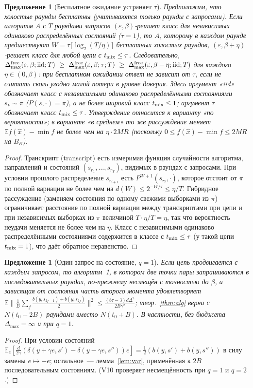 \documentclass[11pt,a4paper]{article}
\numberwithin{equation}{section}
\newtheorem{proposition}[theorem]{Предложение}
\theoremstyle{definition}
\theoremstyle{remark}
\newcommand{\E}{\mathbb E}\newcommand{\R}{\mathbb R}\newcommand{\N}{\mathbb N}\let\Prob\relax\newcommand{\Prob}{\mathbb P}
\newcommand{\norm}[1]{\lVert #1\rVert}\newcommand{\abs}[1]{\lvert #1\rvert}\newcommand{\ip}[2]{\langle #1,#2\rangle}
\newcommand{\Dmax}{\Delta_{\max}}\newcommand{\Dcp}{\Delta_{\rm cp}}
\begin{document}
\begin{proposition}[Бесплатное ожидание устраняет $\tau$]\label{prop:wait}
Предположим, что холостые раунды бесплатны (учитываются только раунды с запросами). Если алгоритм $A$ с $T$ раундами запросов $(\varepsilon,\beta)$-решает класс для независимых одинаково распределённых состояний ($\tau=1$), то $A$, которому в каждом раунде предшествуют $W=\tau\lceil\log_2(T/\eta)\rceil$ бесплатных холостых раундов, $(\varepsilon,\beta+\eta)$-решает класс для любой цепи с $t_{\rm mix}\le\tau$. Следовательно, $\Dmax^{\rm free}(\varepsilon,\beta;{\rm iid};T)\ \ge\ \Dmax^{\rm free}(\varepsilon,\beta;\tau;T)\ \ge\ \Dmax^{\rm free}(\varepsilon,\beta-\eta;{\rm iid};T)$ для каждого $\eta\in(0,\beta)$: при бесплатном ожидании ответ не зависит от $\tau$, если не считать сколь угодно малой потери в уровне доверия. Здесь аргумент «iid» обозначает класс с независимыми одинаково распределёнными состояниями $s_k\sim\pi$ ($P(s,\cdot)=\pi$), \emph{а не} более широкий класс $t_{\rm mix}\le1$; аргумент $\tau$ обозначает класс $t_{\rm mix}\le\tau$. Утверждение относится к варианту «по вероятности»; в варианте «в среднем» то же рассуждение меняет $\E f(\hat x)-\min f$ не более чем на $\eta\cdot2MR$ (поскольку $0\le f(\hat x)-\min f\le2MR$ на $B_R$).
\end{proposition}
\begin{proof}
Транскрипт (transcript) есть измеримая функция случайности алгоритма, направлений и состояний $(s_{r_1},\dots,s_{r_T})$, видимых в раундах с запросами. При условии прошлого распределение $s_{r_{i+1}}$ есть $P^{W+1}(s_{r_i},\cdot)$, которое отстоит от $\pi$ по полной вариации не более чем на $d(W)\le2^{-W/\tau}\le\eta/T$. Гибридное рассуждение (заменяем состояния по одному свежими выборками из $\pi$) ограничивает расстояние по полной вариации между транскриптами при цепи и при независимых выборках из $\pi$ величиной $T\cdot\eta/T=\eta$, так что вероятность неудачи меняется не более чем на $\eta$. Класс с независимыми одинаково распределёнными состояниями содержится в классе с $t_{\rm mix}\le\tau$ (у такой цепи $t_{\rm mix}=1$), что даёт обратное неравенство.
\end{proof}

\begin{proposition}[Один запрос на состояние, $q=1$]\label{prop:q1}
Если цепь продвигается с каждым запросом, то алгоритм~1, в котором две точки пары запрашиваются в последовательных раундах, по-прежнему несмещён с точностью до $\beta$, а зависящая от состояния часть второго момента удовлетворяет $\E\norm{\frac1B\sum_j\frac{b(y,s_{2j-1})+b(y,s_{2j})}2}^2\le\frac{(8\tau-3)d\Delta^2}{2B\gamma^2}$; теор.~\ref{thm:alg} верна с $N(t_0+2B)$ раундами вместо $N(t_0+B)$. В частности, без бюджета $\Dmax=\infty$ и при $q=1$.
\end{proposition}
\begin{proof}
При условии состояний $\E_e[\frac d{2\gamma}(\delta(y+\gamma e,s')-\delta(y-\gamma e,s''))e]=\frac12(b(y,s')+b(y,s''))$ в силу замены $e\mapsto-e$; остальное~--- лемма~\ref{lem:var}, применённая к $2B$ последовательным состояниям. (V10 проверяет несмещённость при $q=1$ и $q=2$.)
\end{proof}
\end{document}
